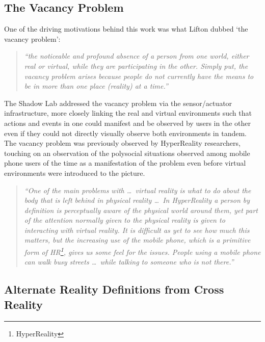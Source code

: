 
\subsection{The Vacancy Problem}

One of the driving motivations behind this work was what Lifton dubbed `the vacancy problem':

\begin{quote}
\textit{``the noticeable and profound absence of a person from one world, either real or virtual, while they are participating in the other. Simply put, the vacancy problem arises because people do not currently have the means to be in more than one place (reality) at a time.''}~\cite{Lifton2007a}
\end{quote}

The Shadow Lab addressed the vacancy problem via the sensor/actuator infrastructure, more closely linking the real and virtual environments such that actions and events in one could manifest and be observed by users in the other even if they could not directly visually observe both environments in tandem. The vacancy problem was previously observed by HyperReality researchers, touching on an observation of the polysocial situations observed among mobile phone users of the time as a manifestation of the problem even before virtual environments were introduced to the picture. %

\begin{quote}
	\textit{``One of the main problems with \ldots\ virtual reality is what to do about the body that is left behind in physical reality \ldots\ In HyperReality a person by definition is perceptually aware of the physical world around them, yet part of the attention normally given to the physical reality is given to interacting with virtual reality. It is difficult as yet to see how much this matters, but the increasing use of the mobile phone, which is a primitive form of HR\footnote{HyperReality}, gives us some feel for the issues. People using a mobile phone can walk busy streets \ldots\ while talking to someone who is not there.''}~\cite{Terashima2001}
\end{quote}


\subsection{Alternate Reality Definitions from Cross Reality}


